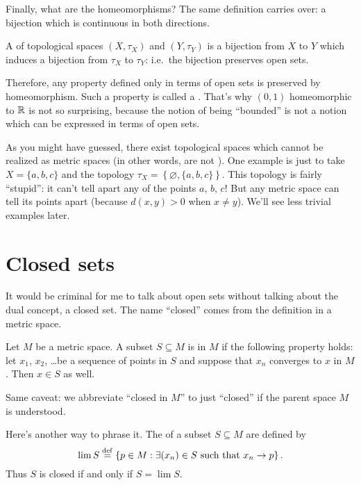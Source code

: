 
Finally, what are the homeomorphisms?
The same definition carries over: a bijection which is continuous in both directions.
\begin{definition}
	A  of topological spaces $(X, \tau_X)$ and $(Y, \tau_Y)$
	is a bijection from $X$ to $Y$
	which induces a bijection from $\tau_X$ to $\tau_Y$:
	i.e.\ the bijection preserves open sets.
\end{definition}
Therefore, any property defined only in terms of open sets is preserved by homeomorphism.
Such a property is called a .
That's why $(0,1)$ homeomorphic to $\mathbb R$ is not so surprising,
because the notion of being ``bounded'' is not a notion
which can be expressed in terms of open sets.

\begin{remark}
	As you might have guessed, there exist topological spaces which cannot be realized
	as metric spaces (in other words, are not ).
	One example is just to take $X = \{a,b,c\}$ and the topology $\tau_X = \left\{ \varnothing, \{a,b,c\} \right\}$.
	This topology is fairly ``stupid'': it can't tell apart any of the points $a$, $b$, $c$!
	But any metric space can tell its points apart (because $d(x,y) > 0$ when $x \neq y$).
	We'll see less trivial examples later.
\end{remark}


\section{Closed sets}
It would be criminal for me to talk about open sets without talking about the dual concept, a closed set.
The name ``closed'' comes from the definition in a metric space.
\begin{definition}
	Let $M$ be a metric space.
	A subset $S \subseteq M$ is  in $M$ if the following property holds:
	let $x_1$, $x_2$, \dots be a sequence of points in $S$
	and suppose that $x_n$ converges to $x$ in $M$.
	Then $x \in S$ as well.
\end{definition}
\begin{abuse}
	Same caveat: we abbreviate ``closed in $M$'' to just ``closed''
	if the parent space $M$ is understood.
\end{abuse}
Here's another way to phrase it.
The  of a subset $S \subseteq M$ are defined by
\[ \lim S \overset{\mathrm{def}}{=} \left\{ p \in M : \exists (x_n) \in S \text{ such that } x_n \to p \right\}. \]
Thus $S$ is closed if and only if $S = \lim S$.

